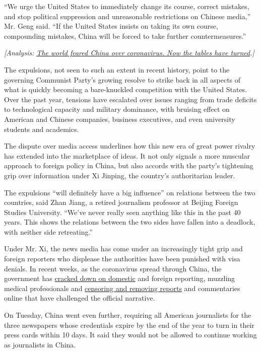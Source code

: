 ``We urge the United States to immediately change its course, correct
mistakes, and stop political suppression and unreasonable restrictions
on Chinese media,'' Mr. Geng said. ``If the United States insists on
taking its own course, compounding mistakes, China will be forced to
take further countermeasures.''

\emph{{[}Analysis:}
\href{http://www.nytimes3xbfgragh.onion/2020/03/19/world/asia/coronavirus-china-united-states.html}{\emph{The
world feared China over coronavirus. Now the tables have
turned}}\emph{.{]}}

The expulsions, not seen to such an extent in recent history, point to
the governing Communist Party's growing resolve to strike back in all
aspects of what is quickly becoming a bare-knuckled competition with the
United States. Over the past year, tensions have escalated over issues
ranging from trade deficits to technological capacity and military
dominance, with bruising effect on American and Chinese companies,
business executives, and even university students and academics.

The dispute over media access underlines how this new era of great power
rivalry has extended into the marketplace of ideas. It not only signals
a more muscular approach to foreign policy in China, but also accords
with the party's tightening grip over information under Xi Jinping, the
country's authoritarian leader.

The expulsions ``will definitely have a big influence'' on relations
between the two countries, said Zhan Jiang, a retired journalism
professor at Beijing Foreign Studies University. ``We've never really
seen anything like this in the past 40 years. This shows the relations
between the two sides have fallen into a deadlock, with neither side
retreating.''

Under Mr. Xi, the news media has come under an increasingly tight grip
and foreign reporters who displease the authorities have been punished
with visa denials. In recent weeks, as the coronavirus spread through
China, the government has
\href{https://www.nytimes3xbfgragh.onion/2020/03/14/business/media/coronavirus-china-journalists.html}{cracked
down on domestic} and foreign reporting, muzzling medical professionals
and
\href{https://www.nytimes3xbfgragh.onion/2020/03/16/business/china-coronavirus-internet-police.html}{censoring
and removing reports} and commentaries online that have challenged the
official narrative.

On Tuesday, China went even further, requiring all American journalists
for the three newspapers whose credentials expire by the end of the year
to turn in their press cards within 10 days. It said they would not be
allowed to continue working as journalists in China.

